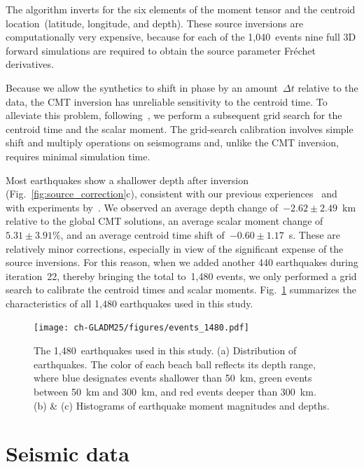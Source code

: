 The algorithm inverts for the six elements of the moment tensor
and the centroid location~(latitude, longitude, and depth).
These source inversions are computationally very expensive,
because for each of the 1,040~events nine full 3D forward simulations are required to obtain the source parameter Fr\'echet derivatives.

Because we allow the synthetics to shift in phase by an amount~$\Delta t$ relative to the data,
the CMT inversion has unreliable sensitivity to the centroid time.
To alleviate this problem,
following~\cite{zhu2012structure},
we perform a subsequent grid search for the centroid time and the scalar moment.
The grid-search calibration involves simple shift and multiply operations on seismograms
and, unlike the CMT inversion, requires minimal simulation time.

Most earthquakes show a shallower depth after inversion
(Fig.~\ref{fig:source_correction}c),
consistent with our previous experiences~\cite{zhu2015seismic,chen2015multiparameter,bozdaug2016global} and with experiments by~\cite{hjorleifsdottir2010effects}.
We observed an average depth change of~$-2.62\pm2.49$~km relative to the global CMT solutions,
an average scalar moment change of~$5.31\pm3.91$\%,
and an average centroid time shift of~$-0.60\pm1.17$~s.
These are relatively minor corrections, especially in view of the significant expense of the source inversions.
For this reason, when we added another 440 earthquakes during iteration~22,
thereby bringing the total to~1,480 events,
we only performed a grid search to calibrate the centroid times and scalar moments.
Fig.~\ref{fig:event_1480} summarizes the characteristics of all 1,480 earthquakes used in this study.

\begin{figure}
  \centering
  \texttt{[image: ch-GLADM25/figures/events\_1480.pdf]}
  \caption[The distribution of 1,480 earthquakes used in structural inversion]
  {\small{The 1,480~earthquakes used in this study. (a) Distribution of earthquakes. The color of each beach ball reflects its depth range, where blue designates events shallower than 50~km, green events between 50~km and 300~km, and red events deeper than 300~km. (b) \& (c) Histograms of earthquake moment magnitudes and depths.}}
  \label{fig:event_1480}
\end{figure}


\section{Seismic data}
\label{section:data}

